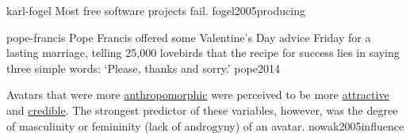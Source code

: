\documentclass{article}
\begin{document}



\qte
  {karl-fogel}
  {Most free software projects fail.}
  {fogel2005producing}

\qte
  {pope-francis}
  {Pope Francis offered some Valentine’s Day advice Friday for a lasting marriage, telling 25,000 lovebirds that the recipe for success lies in saying three simple words: `Please, thanks and sorry.'{}}
  {pope2014}

  {Avatars that were more \ul{anthropomorphic} were perceived to be more \ul{attractive} and \ul{credible}. The strongest predictor of these variables, however, was the degree of masculinity or femininity (lack of androgyny) of an avatar.}
  {nowak2005influence}
\end{document}
